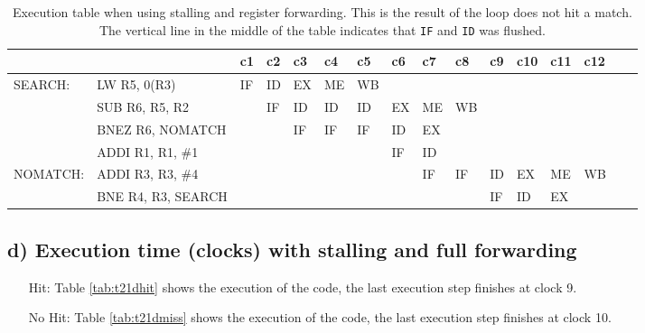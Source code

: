 \begin{landscape}
    \begin{table}[]
    \centering
    \begin{tabular}{llllllllllllllll}
    \hline
             &                                         & c1 & c2 & c3 & c4 & c5 & c6 & c7                      & c8 & c9 & c10 & c11 & c12 \\ \hline
    SEARCH:  & \multicolumn{1}{l|}{LW R5, 0(R3)}       & IF & ID & EX & ME & WB &    &                         &    &    &     &     &     \\
             & \multicolumn{1}{l|}{SUB R6, R5, R2}     &    & IF & ID & ID & ID & EX & ME                      & WB &    &     &     &     \\
             & \multicolumn{1}{l|}{BNEZ R6, NOMATCH}   &    &    & IF & IF & IF & ID & EX                      &    &    &     &     &     \\
             & \multicolumn{1}{l|}{ADDI R1, R1, \#1}   &    &    &    &    &    & IF & \multicolumn{1}{l|}{ID} &    &    &     &     &     \\
    NOMATCH: & \multicolumn{1}{l|}{ADDI R3, R3, \#4}   &    &    &    &    &    &    & \multicolumn{1}{l|}{IF} & IF & ID & EX  & ME  & WB  \\
             & \multicolumn{1}{l|}{BNE R4, R3, SEARCH} &    &    &    &    &    &    &                         &    & IF & ID  & EX  &     \\ \hline
    \end{tabular}
    \caption{Execution table when using stalling and register forwarding. This is the result of the loop does not hit a match. The vertical line in the middle of the table indicates that \texttt{IF} and \texttt{ID} was flushed.}
    \label{tab:t21cmiss}
    \end{table}

\end{landscape}




\subsection{d) Execution time (clocks) with stalling and full forwarding}
\begin{itemize}
    \item[Hit: ] Table \ref{tab:t21dhit} shows  the execution of the code, the
    last execution step finishes at clock 9.

    \item[No Hit: ] Table \ref{tab:t21dmiss} shows  the execution of the code, the
    last execution step finishes at clock 10.
\end{itemize}

